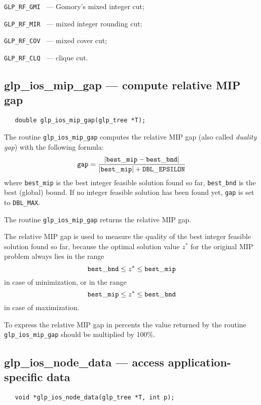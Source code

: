 \verb|GLP_RF_GMI | --- Gomory's mixed integer cut;

\verb|GLP_RF_MIR | --- mixed integer rounding cut;

\verb|GLP_RF_COV | --- mixed cover cut;

\verb|GLP_RF_CLQ | --- clique cut.

\subsection{glp\_ios\_mip\_gap --- compute relative MIP gap}

\synopsis

\begin{verbatim}
   double glp_ios_mip_gap(glp_tree *T);
\end{verbatim}

\description

The routine \verb|glp_ios_mip_gap| computes the relative MIP gap (also
called {\it duality gap}) with the following formula:
$${\tt gap} = \frac{|{\tt best\_mip} - {\tt best\_bnd}|}
{|{\tt best\_mip}| + {\tt DBL\_EPSILON}}$$
where \verb|best_mip| is the best integer feasible solution found so
far, \verb|best_bnd| is the best (global) bound. If no integer feasible
solution has been found yet, \verb|gap| is set to \verb|DBL_MAX|.

\returns

The routine \verb|glp_ios_mip_gap| returns the relative MIP gap.


The relative MIP gap is used to measure the quality of the best integer
feasible solution found so far, because the optimal solution value
$z^*$ for the original MIP problem always lies in the range
$${\tt best\_bnd}\leq z^*\leq{\tt best\_mip}$$
in case of minimization, or in the range
$${\tt best\_mip}\leq z^*\leq{\tt best\_bnd}$$
in case of maximization.

To express the relative MIP gap in percents the value returned by the
routine \verb|glp_ios_mip_gap| should be multiplied by 100\%.

\subsection{glp\_ios\_node\_data --- access application-specific data}

\synopsis

\begin{verbatim}
   void *glp_ios_node_data(glp_tree *T, int p);
\end{verbatim}

